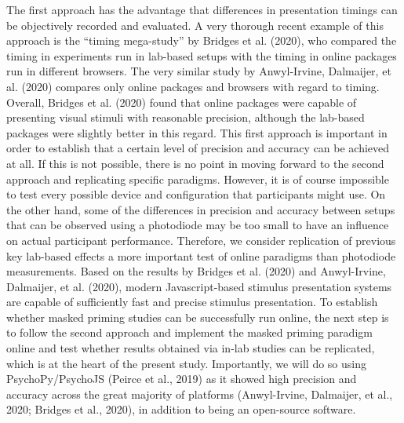 \documentclass[
  english,
  man,floatsintext]{apa6}
\begin{document}
The first approach has the advantage that differences in presentation timings can be objectively recorded and evaluated. A very thorough recent example of this approach is the ``timing mega-study'' by Bridges et al. (2020), who compared the timing in experiments run in lab-based setups with the timing in online packages run in different browsers. The very similar study by Anwyl-Irvine, Dalmaijer, et al. (2020) compares only online packages and browsers with regard to timing. Overall, Bridges et al. (2020) found that online packages were capable of presenting visual stimuli with reasonable precision, although the lab-based packages were slightly better in this regard. This first approach is important in order to establish that a certain level of precision and accuracy can be achieved at all. If this is not possible, there is no point in moving forward to the second approach and replicating specific paradigms. However, it is of course impossible to test every possible device and configuration that participants might use. On the other hand, some of the differences in precision and accuracy between setups that can be observed using a photodiode may be too small to have an influence on actual participant performance. Therefore, we consider replication of previous key lab-based effects a more important test of online paradigms than photodiode measurements. Based on the results by Bridges et al. (2020) and Anwyl-Irvine, Dalmaijer, et al. (2020), modern Javascript-based stimulus presentation systems are capable of sufficiently fast and precise stimulus presentation. To establish whether masked priming studies can be successfully run online, the next step is to follow the second approach and implement the masked priming paradigm online and test whether results obtained via in-lab studies can be replicated, which is at the heart of the present study. Importantly, we will do so using PsychoPy/PsychoJS (Peirce et al., 2019) as it showed high precision and accuracy across the great majority of platforms (Anwyl-Irvine, Dalmaijer, et al., 2020; Bridges et al., 2020), in addition to being an open-source software.
\end{document}

